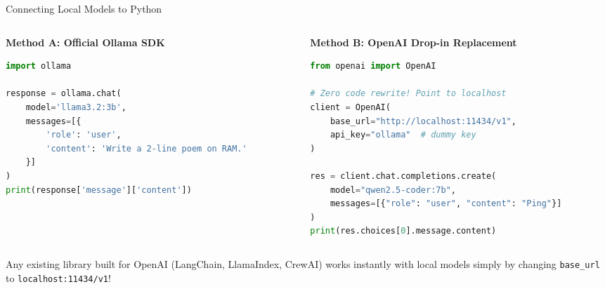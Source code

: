 \documentclass[10pt,aspectratio=169]{beamer}
\begin{document}
\begin{frame}[fragile]{Connecting Local Models to Python}
    \begin{columns}[T]
        \begin{column}{0.5\textwidth}
            \textbf{Method A: Official Ollama SDK}
\begin{lstlisting}[language=Python]
import ollama

response = ollama.chat(
    model='llama3.2:3b',
    messages=[{
        'role': 'user',
        'content': 'Write a 2-line poem on RAM.'
    }]
)
print(response['message']['content'])
\end{lstlisting}
        \end{column}
        \begin{column}{0.5\textwidth}
            \textbf{Method B: OpenAI Drop-in Replacement}
\begin{lstlisting}[language=Python]
from openai import OpenAI

# Zero code rewrite! Point to localhost
client = OpenAI(
    base_url="http://localhost:11434/v1",
    api_key="ollama"  # dummy key
)

res = client.chat.completions.create(
    model="qwen2.5-coder:7b",
    messages=[{"role": "user", "content": "Ping"}]
)
print(res.choices[0].message.content)
\end{lstlisting}
        \end{column}
    \end{columns}
    \vspace{0.3cm}
    \begin{tcolorbox}[colback=ShoeGreen!10, colframe=ShoeGreen, title=\textbf{Shoestring Superpower}]
        \small
        Any existing library built for OpenAI (LangChain, LlamaIndex, CrewAI) works instantly with local models simply by changing \texttt{base\_url} to \texttt{localhost:11434/v1}!
    \end{tcolorbox}
\end{frame}
\end{document}
